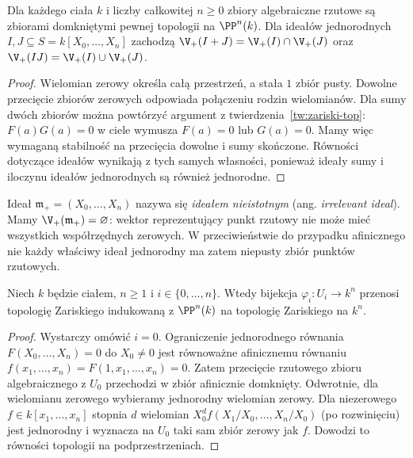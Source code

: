 \begin{twierdzenie}
\label{tw:projective-zariski}
Dla każdego ciała $k$ i liczby całkowitej $n\ge0$ zbiory algebraiczne rzutowe
są zbiorami domkniętymi pewnej topologii na $\PP^n(k)$.
Dla ideałów jednorodnych $I,J\subseteq S=k[X_0,\dots,X_n]$ zachodzą
$\V_+(I+J)=\V_+(I)\cap\V_+(J)$ oraz
$\V_+(IJ)=\V_+(I)\cup\V_+(J)$.
\end{twierdzenie}
\begin{proof}
Wielomian zerowy określa całą przestrzeń, a stała $1$
zbiór pusty. Dowolne przecięcie zbiorów zerowych odpowiada
połączeniu rodzin wielomianów. Dla sumy dwóch zbiorów
można powtórzyć argument z twierdzenia~\ref{tw:zariski-top}:
$F(a)G(a)=0$ w ciele wymusza $F(a)=0$ lub $G(a)=0$.
Mamy więc wymaganą stabilność na przecięcia dowolne i sumy
skończone. Równości dotyczące ideałów wynikają z tych samych
własności, ponieważ ideały sumy i iloczynu ideałów jednorodnych
są również jednorodne.
\end{proof}

\begin{uwaga}
Ideał $\mathfrak m_+=(X_0,\dots,X_n)$ nazywa się
\emph{ideałem nieistotnym} (ang. \emph{irrelevant ideal}).
Mamy $\V_+(\mathfrak m_+)=\varnothing$: wektor reprezentujący
punkt rzutowy nie może mieć wszystkich współrzędnych zerowych.
W przeciwieństwie do przypadku afinicznego nie każdy właściwy
ideał jednorodny ma zatem niepusty zbiór punktów rzutowych.
\end{uwaga}

\begin{stwierdzenie}
Niech $k$ będzie ciałem, $n\ge1$ i $i\in\{0,\dots,n\}$.
Wtedy bijekcja $\varphi_i:U_i\to k^n$
przenosi topologię Zariskiego indukowaną z $\PP^n(k)$
na topologię Zariskiego na $k^n$.
\end{stwierdzenie}
\begin{proof}
Wystarczy omówić $i=0$. Ograniczenie jednorodnego równania
$F(X_0,\dots,X_n)=0$ do $X_0\ne0$ jest równoważne
afinicznemu równaniu $f(x_1,\dots,x_n)=F(1,x_1,\dots,x_n)=0$.
Zatem przecięcie rzutowego zbioru algebraicznego z $U_0$
przechodzi w zbiór afinicznie domknięty. Odwrotnie,
dla wielomianu zerowego wybieramy jednorodny wielomian
zerowy. Dla niezerowego $f\in k[x_1,\dots,x_n]$ stopnia $d$
wielomian $X_0^df(X_1/X_0,\dots,X_n/X_0)$
(po rozwinięciu) jest jednorodny i wyznacza na $U_0$
taki sam zbiór zerowy jak $f$. Dowodzi to równości
topologii na podprzestrzeniach.
\end{proof}

